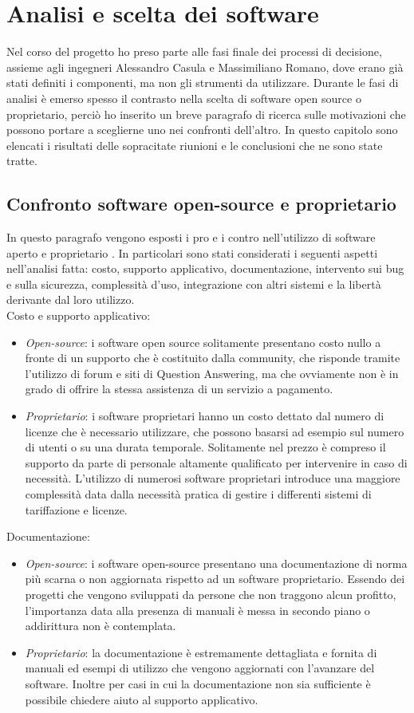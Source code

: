 \documentclass[a4paper, 12pt]{report}
\numberwithin{equation}{section}
\begin{document}
\chapter{Analisi e scelta dei software}
Nel corso del progetto ho preso parte alle fasi finale dei processi di decisione, assieme agli ingegneri Alessandro Casula e Massimiliano Romano, dove erano già stati definiti i componenti, ma non gli strumenti da utilizzare. Durante le fasi di analisi è emerso spesso il contrasto nella scelta di software open source o proprietario, perciò ho inserito un breve paragrafo di ricerca sulle motivazioni che possono portare a sceglierne uno nei confronti dell'altro.  In questo capitolo sono elencati i risultati delle sopracitate riunioni e le conclusioni che ne sono state tratte.

\section{Confronto software open-source e proprietario}
In questo paragrafo vengono esposti i pro e i contro nell’utilizzo di software aperto e proprietario \cite{opensource-vs-proprietary}. In particolari sono stati considerati i seguenti aspetti nell’analisi fatta: costo, supporto applicativo, documentazione, intervento sui bug e sulla sicurezza, complessità d’uso, integrazione con altri sistemi e la libertà derivante dal loro utilizzo.\\
Costo e supporto applicativo:
\begin{itemize}
    \item \emph{Open-source}: i software open source solitamente presentano costo nullo a fronte di un supporto che è costituito dalla community, che risponde tramite l’utilizzo di forum e siti di Question Answering, ma che ovviamente non è in grado di offrire la stessa assistenza di un servizio a pagamento.
    \item \emph{Proprietario}: i software proprietari hanno un costo dettato dal numero di licenze che è necessario utilizzare, che possono basarsi ad esempio sul numero di utenti o su una durata temporale. Solitamente nel prezzo è compreso il supporto da parte di personale altamente qualificato per intervenire in caso di necessità. L’utilizzo di numerosi software proprietari introduce una maggiore complessità data dalla necessità pratica di gestire i differenti sistemi di tariffazione e licenze.
\end{itemize}
Documentazione:
\begin{itemize}
    \item \emph{Open-source}: i software open-source presentano una documentazione di norma più scarna o non aggiornata rispetto ad un software proprietario. Essendo dei progetti che vengono sviluppati da persone che non traggono alcun profitto, l’importanza data alla presenza di manuali è messa in secondo piano o addirittura non è contemplata.
    \item \emph{Proprietario}: la documentazione è estremamente dettagliata e fornita di manuali ed esempi di utilizzo che vengono aggiornati con l’avanzare del software. Inoltre per casi in cui la documentazione non sia sufficiente è possibile chiedere aiuto al supporto applicativo.
\end{itemize}
\end{document}
